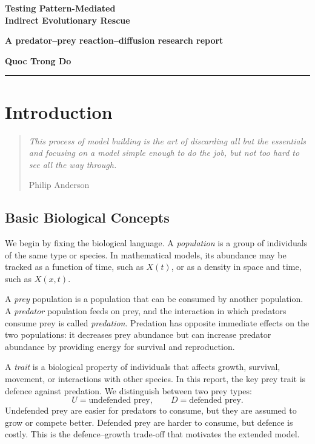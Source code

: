 \documentclass[12pt,letterpaper]{article}
\makeatletter
\numberwithin{equation}{section}
\renewcommand{\tableofcontents}{%
    \section*{\contentsname}%
    \@starttoc{toc}%
}
\newcommand{\notestitle}{Testing Pattern-Mediated\\Indirect Evolutionary Rescue}
\newcommand{\notessubtitle}{A predator--prey reaction--diffusion research report}
\newcommand{\notesauthor}{Quoc Trong Do}
\newenvironment{lecturequote}[1]
{\def\lecturequoteauthor{#1}\begin{quote}\itshape}
{\par\medskip\hfill \lecturequoteauthor\end{quote}}
\makeatother
\begin{document}
\hypersetup{pageanchor=false}

\begin{center}
{\sffamily\bfseries\LARGE \notestitle\par}
\vspace{0.18in}
{\sffamily\bfseries\large \notessubtitle\par}
\vspace{0.15in}
{\bfseries \notesauthor\par}
\end{center}
\vspace{0.15in}
\noindent\rule{\linewidth}{0.5pt}
\vspace{0.2in}

\hypersetup{pageanchor=true}
\tableofcontents
\clearpage

\setcounter{page}{1}

\section{Introduction}

\begin{lecturequote}{Philip Anderson}
This process of model building is the art of discarding all but the essentials and
focusing on a model simple enough to do the job, but not too hard to see all the way
through.
\end{lecturequote}

\subsection{Basic Biological Concepts}

We begin by fixing the biological language. A \emph{population} is a group of
individuals of the same type or species. In mathematical models, its abundance may be
tracked as a function of time, such as $X(t)$, or as a density in space and time, such
as $X(x,t)$.

A \emph{prey} population is a population that can be consumed by another population.
A \emph{predator} population feeds on prey, and the interaction in which predators
consume prey is called \emph{predation}. Predation has opposite immediate effects on
the two populations: it decreases prey abundance but can increase predator abundance by
providing energy for survival and reproduction.

A \emph{trait} is a biological property of individuals that affects growth, survival,
movement, or interactions with other species. In this report, the key prey trait is
defence against predation. We distinguish between two prey types:
\begin{equation}
    U=\text{undefended prey},
    \qquad
    D=\text{defended prey}.
\end{equation}
Undefended prey are easier for predators to consume, but they are assumed to grow or
compete better. Defended prey are harder to consume, but defence is costly. This is the
defence--growth trade-off that motivates the extended model.
\end{document}

